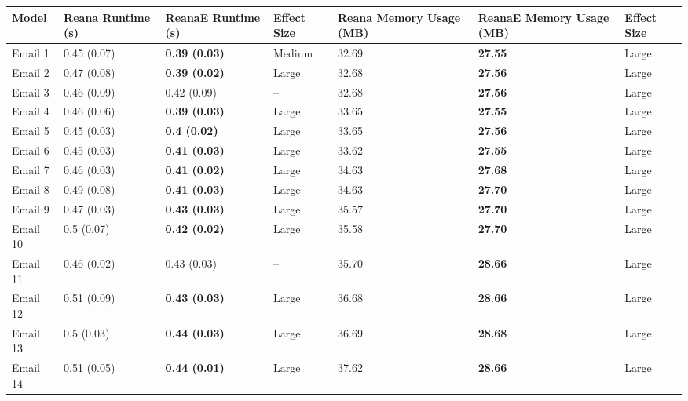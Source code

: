 \begin{tabular}{lllllll}
\toprule
    Model & Reana Runtime (s) &    ReanaE Runtime (s) & Effect Size & Reana Memory Usage (MB) & ReanaE Memory Usage (MB) & Effect Size \\
\midrule
  Email 1 &       0.45 (0.07) &  \textbf{0.39 (0.03)} &      Medium &                   32.69 &           \textbf{27.55} &       Large \\
  Email 2 &       0.47 (0.08) &  \textbf{0.39 (0.02)} &       Large &                   32.68 &           \textbf{27.56} &       Large \\
  Email 3 &       0.46 (0.09) &           0.42 (0.09) &          -- &                   32.68 &           \textbf{27.56} &       Large \\
  Email 4 &       0.46 (0.06) &  \textbf{0.39 (0.03)} &       Large &                   33.65 &           \textbf{27.55} &       Large \\
  Email 5 &       0.45 (0.03) &   \textbf{0.4 (0.02)} &       Large &                   33.65 &           \textbf{27.56} &       Large \\
  Email 6 &       0.45 (0.03) &  \textbf{0.41 (0.03)} &       Large &                   33.62 &           \textbf{27.55} &       Large \\
  Email 7 &       0.46 (0.03) &  \textbf{0.41 (0.02)} &       Large &                   34.63 &           \textbf{27.68} &       Large \\
  Email 8 &       0.49 (0.08) &  \textbf{0.41 (0.03)} &       Large &                   34.63 &           \textbf{27.70} &       Large \\
  Email 9 &       0.47 (0.03) &  \textbf{0.43 (0.03)} &       Large &                   35.57 &           \textbf{27.70} &       Large \\
 Email 10 &        0.5 (0.07) &  \textbf{0.42 (0.02)} &       Large &                   35.58 &           \textbf{27.70} &       Large \\
 Email 11 &       0.46 (0.02) &           0.43 (0.03) &          -- &                   35.70 &           \textbf{28.66} &       Large \\
 Email 12 &       0.51 (0.09) &  \textbf{0.43 (0.03)} &       Large &                   36.68 &           \textbf{28.66} &       Large \\
 Email 13 &        0.5 (0.03) &  \textbf{0.44 (0.03)} &       Large &                   36.69 &           \textbf{28.68} &       Large \\
 Email 14 &       0.51 (0.05) &  \textbf{0.44 (0.01)} &       Large &                   37.62 &           \textbf{28.66} &       Large \\

\end{tabular}
